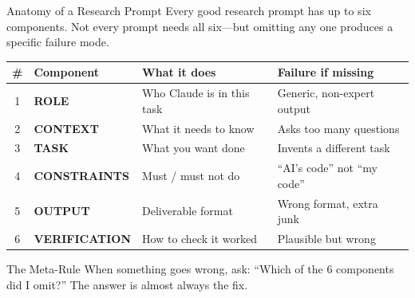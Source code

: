 \documentclass[aspectratio=169,10pt]{beamer}
\newcommand{\emphc}[1]{\textcolor{harvardcrimson}{#1}}
\begin{document}
\begin{frame}{Anatomy of a Research Prompt}
\small
Every good research prompt has up to \emphc{six components}. Not every prompt needs all six---but omitting any one produces a specific failure mode.

\vspace{0.3em}
\begin{center}
\small
\renewcommand{\arraystretch}{1.2}
\begin{tabular}{c p{2.5cm} p{5cm} p{3.5cm}}
\toprule
\textbf{\#} & \textbf{Component} & \textbf{What it does} & \textbf{Failure if missing} \\
\midrule
1 & \textbf{ROLE} & Who Claude is in this task & Generic, non-expert output \\
2 & \textbf{CONTEXT} & What it needs to know & Asks too many questions \\
3 & \textbf{TASK} & What you want done & Invents a different task \\
4 & \textbf{CONSTRAINTS} & Must / must not do & ``AI's code'' not ``my code'' \\
5 & \textbf{OUTPUT} & Deliverable format & Wrong format, extra junk \\
6 & \textbf{VERIFICATION} & How to check it worked & Plausible but wrong \\
\bottomrule
\end{tabular}
\end{center}

\vspace{0.3em}
\begin{block}{The Meta-Rule}
When something goes wrong, ask: ``Which of the 6 components did I omit?'' The answer is almost always the fix.
\end{block}
\end{frame}
\end{document}

